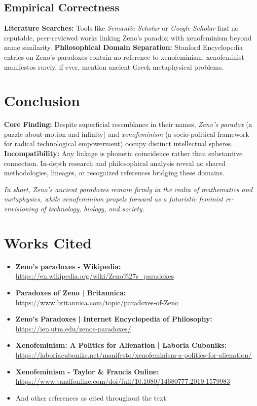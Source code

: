 \documentclass[12pt]{article}
\begin{document}
\subsection{Empirical Correctness}

\textbf{Literature Searches:} Tools like \textit{Semantic Scholar} or \textit{Google Scholar} find no reputable, peer-reviewed works linking Zeno’s paradox with xenofeminism beyond name similarity.  
\textbf{Philosophical Domain Separation:} Stanford Encyclopedia entries on Zeno’s paradoxes contain no reference to xenofeminism; xenofeminist manifestos rarely, if ever, mention ancient Greek metaphysical problems.

\section{Conclusion}

\textbf{Core Finding:} Despite superficial resemblance in their names, \textit{Zeno’s paradox} (a puzzle about motion and infinity) and \textit{xenofeminism} (a socio-political framework for radical technological empowerment) occupy distinct intellectual spheres.  
\textbf{Incompatibility:} Any linkage is phonetic coincidence rather than substantive connection. In-depth research and philosophical analysis reveal no shared methodologies, lineages, or recognized references bridging these domains.

\vspace{1em}
\noindent
\textit{In short, Zeno’s ancient paradoxes remain firmly in the realm of mathematics and metaphysics, while xenofeminism propels forward as a futuristic feminist re-envisioning of technology, biology, and society.}

\section*{Works Cited}

\begin{itemize}
    \item \textbf{Zeno's paradoxes - Wikipedia:} \\
          \url{https://en.wikipedia.org/wiki/Zeno%27s_paradoxes}
    \item \textbf{Paradoxes of Zeno | Britannica:} \\
          \url{https://www.britannica.com/topic/paradoxes-of-Zeno}
    \item \textbf{Zeno's Paradoxes | Internet Encyclopedia of Philosophy:} \\
          \url{https://iep.utm.edu/zenos-paradoxes/}
    \item \textbf{Xenofeminism: A Politics for Alienation | Laboria Cuboniks:} \\
          \url{https://laboriacuboniks.net/manifesto/xenofeminism-a-politics-for-alienation/}
    \item \textbf{Xenofeminism - Taylor \& Francis Online:} \\
          \url{https://www.tandfonline.com/doi/full/10.1080/14680777.2019.1579983}
    \item And other references as cited throughout the text.
\end{itemize}
\end{document}
